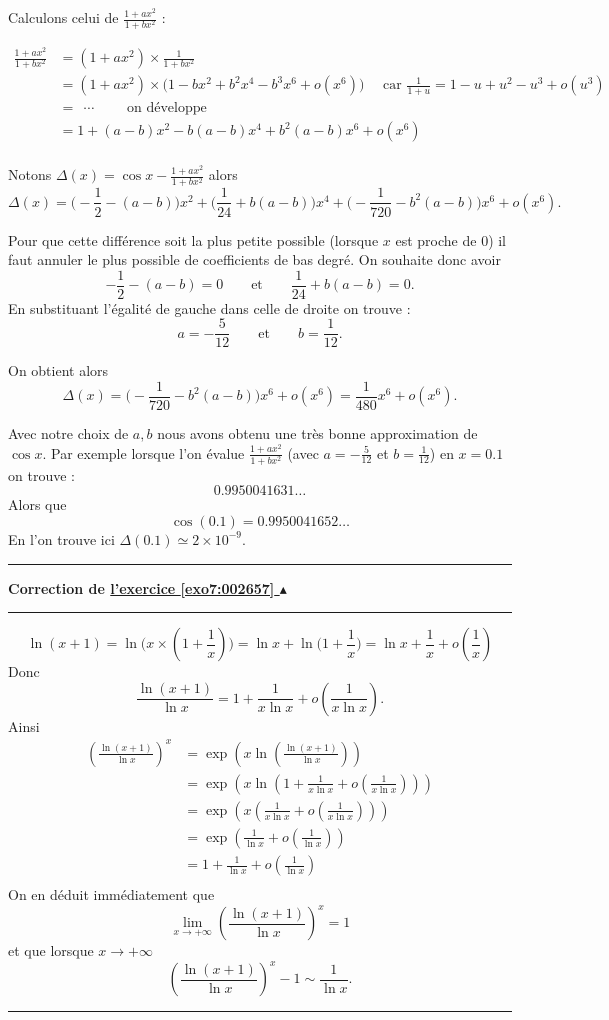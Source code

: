 \documentclass[11pt,a4paper]{article}
\newcounter{exo}
\newcommand{\correction}[1]{\hypertarget{cor7:#1}{}\label{cor7:#1}{\bf Correction de \hyperlink{exo7:#1}{l'exercice \ref{exo7:#1} $\blacktriangle$}}\vspace{1mm}\hrule\vspace{1mm}}
\newcommand{\fincorrection}{\vspace{1mm}\hrule\vspace*{7mm}}
\begin{document}
Calculons celui de $\frac{1+ax^2}{1+bx^2}$ :

\begin{align*}
\frac{1+ax^2}{1+bx^2} 
  & = (1+ax^2) \times \frac{1}{1+bx^2} \\
  & = (1+ax^2)\times \big(1-bx^2+b^2x^4-b^3x^6+o(x^6) \big) \quad \text{ car } \frac{1}{1+u} = 1-u+u^2 - u^3+o(u^3) \\
  &= \ \ \cdots  \qquad \text{ on développe } \\
  &= 1 + (a-b) x^2 - b(a-b) x^4 + b^2(a-b) x^6 + o(x^6) \\
\end{align*}

Notons $\Delta(x) = \cos x - \frac{1+ax^2}{1+bx^2}$ alors 
$$\Delta(x) = \big(-\frac12-(a-b)\big)x^2 + \big(\frac{1}{24} + b(a-b)\big) x^4 
+ \big(-\frac{1}{720}-b^2(a-b)\big) x^6 + o(x^6).$$

Pour que cette différence soit la plus petite possible (lorsque $x$ est proche de $0$)
il faut annuler le plus possible de coefficients de bas degré.
On souhaite donc avoir 
$$-\frac12-(a-b) = 0 \qquad \text{et} \qquad \frac{1}{24} + b(a-b)=0.$$
En substituant l'égalité de gauche dans celle de droite on trouve :
$$a=-\frac{5}{12}  \qquad \text{et} \qquad b=\frac{1}{12}.$$

On obtient alors 
$$\Delta(x) =  \big(-\frac{1}{720}-b^2(a-b)\big) x^6 + o(x^6) = \frac{1}{480} x^6 + o(x^6).$$

\bigskip

Avec notre choix de $a,b$ nous avons obtenu une très bonne approximation de $\cos x$.
Par exemple lorsque l'on évalue  $\frac{1+ax^2}{1+bx^2}$ (avec $a=-\frac{5}{12}$ et $b=\frac{1}{12}$)
en $x=0.1$ on trouve :
$$0.9950041631\ldots$$
Alors que 
$$\cos(0.1)=0.9950041652\ldots$$
En l'on trouve ici $\Delta(0.1) \simeq 2\times 10^{-9}$.
\fincorrection
\correction{002657}

$$\ln(x+1) = \ln \Big(x \times (1+\frac1x)\Big) = \ln x+\ln\big(1+{\frac1x}\big) = \ln x + \frac 1x + o(\frac1x)$$
Donc 
$$\frac{\ln(x+1)}{\ln x} = 1 + \frac1{x\ln x} + o(\frac1{x\ln x}).$$
Ainsi
\begin{align*}
\left(\frac{\ln(x+1)}{\ln x}\right)^x 
  & = \exp\left( x \ln \left( \frac{\ln(x+1)}{\ln x}\right) \right)  \\
  & = \exp\left( x \ln \left(1 + \frac1{x\ln x} + o(\frac1{x\ln x})\right)  \right)  \\
  & = \exp\left( x \left(\frac1{x\ln x} + o(\frac1{x\ln x})\right) \right)  \\
  & = \exp\left( \frac1{\ln x} + o(\frac1{\ln x})\right)  \\
  & = 1 + \frac1{\ln x} + o(\frac1{\ln x}) \\
\end{align*}
On en déduit immédiatement que 
$$\lim_{x\to+\infty}\left(\frac{\ln(x+1)}{\ln x}\right)^x = 1$$
et que lorsque $x\to + \infty$
$$\left(\frac{\ln(x+1)}{\ln x}\right)^x - 1 \sim \frac1{\ln x}.$$
\fincorrection
\end{document}
